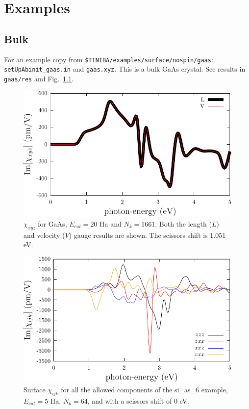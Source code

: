 \documentclass[openany,oneside]{book}
\numberwithin{equation}{section}
\begin{document}
\chapter{Examples}
\section{Bulk} 
For an example copy from \verb=$TINIBA/examples/surface/nospin/gaas=:\\
\verb=setUpAbinit_gaas.in= and \verb=gaas.xyz=. This is a
bulk GaAs crystal. See results in \verb=gaas/res= and Fig.~\ref{shg-bulk}.
\begin{figure}[t]
\begin{center}
\includegraphics[scale=0.5]{plots/shg-bulk}
\end{center}
\caption{$\chi_{xyz}$ for GaAs, $E_{cut}=20$ Ha and $N_k=1661$. Both
  the length ($L$) and velocity ($V$) gauge results are shown.
The scissors shift is 1.051 eV.
}
\label{shg-bulk}
\end{figure}
\begin{figure}[t]
\begin{center}
\includegraphics[scale=0.5]{plots/shg-surface}
\end{center}
\caption{Surface $\chi_{ijk}$ for all the allowed components of the
  si\_as\_6 example, $E_{cut}=5$ 
  Ha, $N_k=64$, and with a scissors shift of 0 eV. 
}
\label{shg-surface}
\end{figure}
\end{document}
